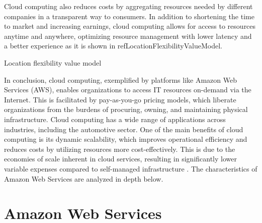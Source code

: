 Cloud computing also reduces costs by aggregating resources needed by different companies in a transparent way to consumers. In addition to shortening the time to market and increasing earnings, cloud computing allows for access to resources anytime and anywhere, optimizing resource management with lower latency and a better experience as it is shown in ref{LocationFlexibilityValueModel}.
\begin{table}[h]
    \caption{Location flexibility value model \cite{CloudComputing}}
    \label{tab:LocationFlexibilityValueModel}
\end{table}

In conclusion, cloud computing, exemplified by platforms like Amazon Web Services (AWS), enables organizations to access IT resources on-demand via the Internet. This is facilitated by pay-as-you-go pricing models, which liberate organizations from the burdens of procuring, owning, and maintaining physical infrastructure. Cloud computing has a wide range of applications across industries, including the automotive sector. One of the main benefits of cloud computing is its dynamic scalability, which improves operational efficiency and reduces costs by utilizing resources more cost-effectively. This is due to the economies of scale inherent in cloud services, resulting in significantly lower variable expenses compared to self-managed infrastructure \cite{AWSWhatIsCloudComputing}. The characteristics of Amazon Web Services are analyzed in depth below.

\section{Amazon Web Services}

